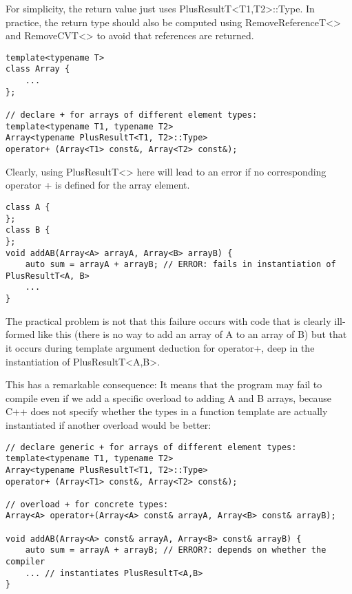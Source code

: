 \begin{tcolorbox}[colback=webgreen!5!white,colframe=webgreen!75!black]
\hspace*{0.75cm}For simplicity, the return value just uses PlusResultT<T1,T2>::Type. In practice, the return type should also be computed using RemoveReferenceT<> and RemoveCVT<> to avoid that references are returned.
\end{tcolorbox}

\begin{lstlisting}[style=styleCXX]
template<typename T>
class Array {
	...
};

// declare + for arrays of different element types:
template<typename T1, typename T2>
Array<typename PlusResultT<T1, T2>::Type>
operator+ (Array<T1> const&, Array<T2> const&);
\end{lstlisting}

Clearly, using PlusResultT<> here will lead to an error if no corresponding operator + is defined for the array element.

\begin{lstlisting}[style=styleCXX]
class A {
};
class B {
};
void addAB(Array<A> arrayA, Array<B> arrayB) {
	auto sum = arrayA + arrayB; // ERROR: fails in instantiation of PlusResultT<A, B>
	...
}
\end{lstlisting}

The practical problem is not that this failure occurs with code that is clearly ill-formed like this (there is no way to add an array of A to an array of B) but that it occurs during template argument deduction for operator+, deep in the instantiation of  PlusResultT<A,B>.

This has a remarkable consequence: It means that the program may fail to compile even if we add a specific overload to adding A and B arrays, because C++ does not specify whether the types in a function template are actually instantiated if another overload would be better:

\begin{lstlisting}[style=styleCXX]
// declare generic + for arrays of different element types:
template<typename T1, typename T2>
Array<typename PlusResultT<T1, T2>::Type>
operator+ (Array<T1> const&, Array<T2> const&);

// overload + for concrete types:
Array<A> operator+(Array<A> const& arrayA, Array<B> const& arrayB);

void addAB(Array<A> const& arrayA, Array<B> const& arrayB) {
	auto sum = arrayA + arrayB; // ERROR?: depends on whether the compiler
	... // instantiates PlusResultT<A,B>
}
\end{lstlisting}

